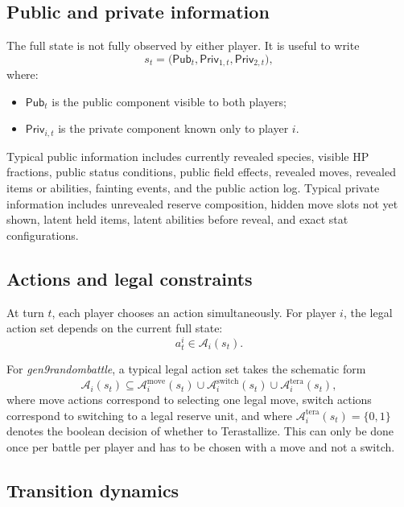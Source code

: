 \documentclass[aps,pre,twocolumn,superscriptaddress,nofootinbib]{revtex4-2}
\newcommand{\cA}{\mathcal{A}}
\theoremstyle{definition}
\theoremstyle{plain}
\begin{document}
\subsection{Public and private information}

The full state is not fully observed by either player. It is useful to write
\begin{equation}
    s_t = \big(\mathsf{Pub}_t,\mathsf{Priv}_{1,t},\mathsf{Priv}_{2,t}\big),
\end{equation}
where:
\begin{itemize}
    \item $\mathsf{Pub}_t$ is the public component visible to both players;
    \item $\mathsf{Priv}_{i,t}$ is the private component known only to player $i$.
\end{itemize}

Typical public information includes currently revealed species, visible HP fractions, public status conditions, public field effects, revealed moves, revealed items or abilities, fainting events, and the public action log. Typical private information includes unrevealed reserve composition, hidden move slots not yet shown, latent held items, latent abilities before reveal, and exact stat configurations.

\subsection{Actions and legal constraints}

At turn $t$, each player chooses an action simultaneously. For player $i$, the legal action set depends on the current full state:
\begin{equation}
    a_t^i \in \cA_i(s_t).
\end{equation}

For \emph{gen9randombattle}, a typical legal action set takes the schematic form
\begin{equation}
    \cA_i(s_t) \subseteq \cA_i^{\mathrm{move}}(s_t) \cup \cA_i^{\mathrm{switch}}(s_t) \cup \cA_i^{\mathrm{tera}}(s_t),
\end{equation}
where move actions correspond to selecting one legal move, switch actions correspond to switching to a legal reserve unit, and where \(\cA_i^{\mathrm{tera}}(s_t) = \{0,1\}\) denotes the boolean decision of whether to Terastallize. This can only be done once per battle per player and has to be chosen with a move and not a switch.

\subsection{Transition dynamics}
\end{document}
